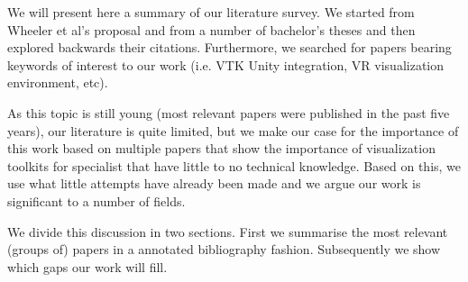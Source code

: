 We will present here a summary of our literature survey. We started from Wheeler et al's proposal \cite{wheeler_virtual_2018} and from a number of bachelor's theses \cite{dreuning_visual_2016, kruis_creating_2017, shutte_virtual_2018} and then explored backwards their citations. Furthermore, we searched for papers bearing keywords of interest to our work (i.e. VTK Unity integration, VR visualization environment, etc). 

As this topic is still young (most relevant papers were published in the past five years), our literature is quite limited, but we make our case for the importance of this work based on multiple papers that show the importance of visualization toolkits for specialist that have little to no technical knowledge. Based on this, we use what little attempts have already been made and we argue our work is significant to a number of fields.

We divide this discussion in two sections. First we summarise the most relevant (groups of) papers in a annotated bibliography fashion. Subsequently we show which gaps our work will fill.